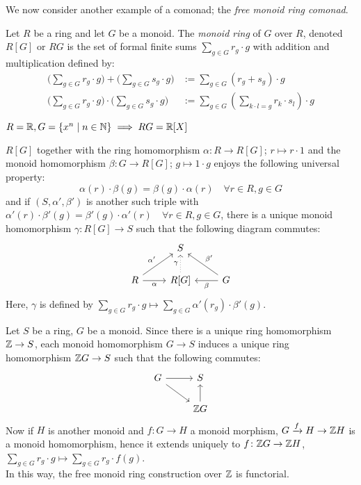We now consider another example of a comonad; the \textit{free monoid ring comonad}.
\begin{definition}
    Let $R$ be a ring and let $G$ be a monoid.
    The \textit{monoid ring} of $G$ over $R$, denoted $R[G]$ or $RG$
    is the set of formal finite sums $\sum_{g \in G}r_g \cdot g$
    with addition and multiplication defined by:
    \begin{align*}
        \big(\sum_{g \in G}r_g \cdot g \big) + \big(\sum_{g \in G}s_g \cdot g \big)
        & := \sum_{g \in G}(r_g + s_g)\cdot g \\
        \big(\sum_{g \in G}r_g \cdot g \big) \cdot \big(\sum_{g \in G}s_g \cdot g\big)
        & := \sum_{g \in G}(\sum_{k \cdot l = g} r_k \cdot s_l)\cdot g 
    \end{align*}
\end{definition}
\begin{example}
    $R = \mathbb{R}, G = \{x^n \mid n \in \mathbb{N}\} \implies RG = \mathbb{R}[X]$
\end{example}
\begin{remark} \label{rem: universal property of monoid ring}
$R[G]$ together with the ring homomorphism $\alpha \colon R \to R[G]$;
$r \mapsto r \cdot 1$ and the monoid homomorphism $\beta \colon 
G \to R[G]$; $g \mapsto 1 \cdot g$ 
enjoys the following universal property:
\[
  \alpha(r) \cdot \beta(g) = \beta(g) \cdot \alpha(r)
   \quad \forall r \in R, g \in G
\]
and if $(S,\alpha',\beta')$ is another such triple with
$\alpha'(r) \cdot \beta'(g) = \beta'(g) \cdot \alpha'(r)
   \quad \forall r \in R, g \in G$,
there is a unique monoid homomorphism $\gamma \colon R[G] \to S$
such that the following diagram commutes:
\[
    \begin{tikzcd}
        & S \\
        R \arrow[r,"\alpha"'] \arrow[ur,"\alpha'"] 
        & R[G] \arrow[u,"\gamma",dotted] 
        & G \arrow[l,"\beta"] \arrow[ul,"\beta'"']
    \end{tikzcd}
\]
Here, $\gamma$ is defined by 
$\sum_{g \in G}r_g \cdot g \mapsto \sum_{g \in G}\alpha'(r_g) \cdot \beta'(g)$.
\end{remark}
\begin{example}
    Let $S$ be a ring, $G$ be a monoid.
    Since there is a unique ring homomorphism $\mathbb{Z} \to S$, 
    each monoid homomorphism $G \to S$ induces a unique ring homomorphism
    $\mathbb{Z} G \to S$ such that the following commutes:
    \[
      \begin{tikzcd}
        G \arrow[r] \arrow[rd] 
        &S \\
        & \Z G \arrow[u]
      \end{tikzcd}
    \]
    Now if $H$ is another monoid and $f \colon G \to H$ a monoid morphism,
    $G \xrightarrow{f} H \to \mathbb{Z} H$ is a monoid homomorphism,
    hence it extends uniquely to $f \colon \mathbb{Z} G \to \mathbb{Z} H$,
    $\sum_{g \in G}r_g \cdot g \mapsto \sum_{g \in G}r_g \cdot f(g)$.\\ 
    In this way, the free monoid ring construction over $\mathbb{Z}$ is functorial.
\end{example}

